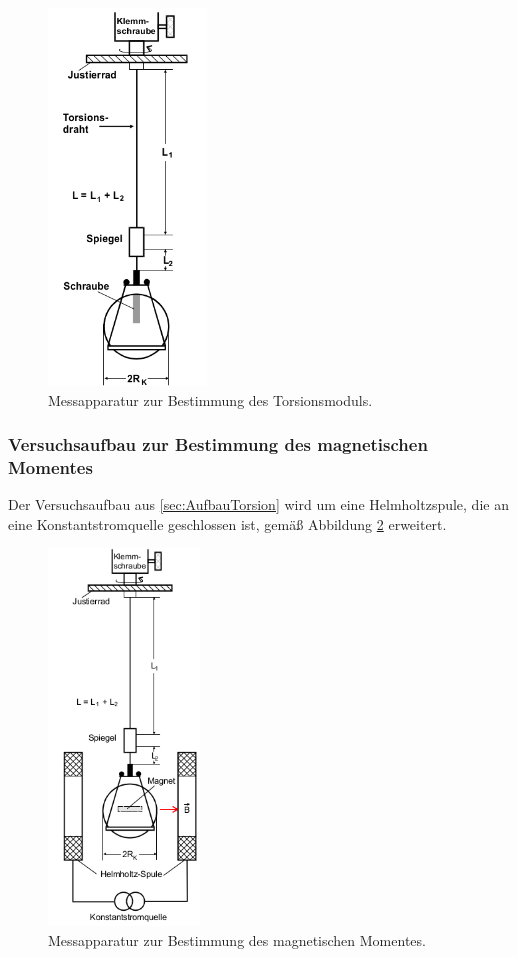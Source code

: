 \begin{figure}
  \centering
  \includegraphics[height=10cm]{ApparaturTorsion.png}
  \caption{Messapparatur zur Bestimmung des Torsionsmoduls.}
  \label{fig:AufbauTorsion}
\end{figure}

\newpage

\subsubsection{Versuchsaufbau zur Bestimmung des magnetischen Momentes }

Der Versuchsaufbau aus \ref{sec:AufbauTorsion} wird um eine Helmholtzspule, die
an eine Konstantstromquelle geschlossen ist, gemäß Abbildung
\ref{fig:AufbauMagnet} erweitert.

\begin{figure}
  \centering
  \includegraphics[height=10cm]{ApparaturMagnet.png}
  \caption{Messapparatur zur Bestimmung des magnetischen Momentes.}
  \label{fig:AufbauMagnet}
\end{figure}


